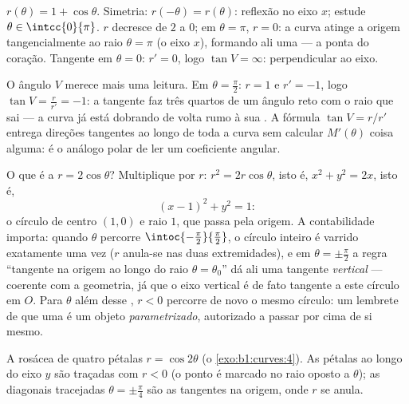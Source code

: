 \begin{example}[A cardioide]\label{ex:b1:curves:cardioid}
$r(\theta) = 1 + \cos\theta$. Simetria: $r(-\theta)
= r(\theta)$: reflexão no eixo $x$; estude
$\theta \in
\intcc{0}{\pi}$. $r$ decresce de $2$ a $0$; em $\theta = \pi$, $r = 0$: a curva atinge a
origem tangencialmente ao raio $\theta = \pi$ (o eixo $x$), formando ali uma
 --- a ponta do coração. Tangente em $\theta = 0$: $r' = 0$, logo
$\tan V = \infty$: perpendicular ao eixo.

O ângulo $V$ merece mais uma leitura. Em $\theta =
\frac\pi2$: $r = 1$ e $r' = -1$,
logo $\tan V = \frac{r}{r'} =
-1$: a tangente faz três quartos de um ângulo reto com o raio
que sai --- a curva já está dobrando de volta rumo à sua . A
fórmula $\tan V = r/r'$ entrega direções tangentes ao longo de toda a curva sem
calcular $M'(\theta)$ coisa alguma: é o análogo polar de ler um coeficiente
angular.
\end{example}

\begin{example}
\label{ex:b1:curves:polarcircle}
O que é a  $r = 2\cos\theta$? Multiplique por $r$: $r^2 = 2r\cos\theta$, isto é,
$x^2 + y^2 = 2x$, isto é,
\[
(x - 1)^2 + y^2 = 1 :
\]
o círculo de centro $(1, 0)$ e raio $1$, que passa pela origem. A
contabilidade importa: quando $\theta$ percorre $\intoc{-\frac\pi2}{\frac\pi2}$, o círculo
inteiro é varrido exatamente uma vez ($r$ anula-se nas duas
extremidades), e em $\theta =
\pm\frac\pi2$ a regra ``tangente na origem ao longo do
raio $\theta = \theta_0$'' dá ali uma tangente \emph{vertical} --- coerente com a
geometria, já que o eixo vertical é de fato tangente a este círculo
em $O$. Para $\theta$ além desse , $r < 0$ percorre de novo
o mesmo círculo: um lembrete de que uma  é um objeto
\emph{parametrizado}, autorizado a passar por cima de si mesmo.
\end{example}

\begin{omfigure}

{\small A rosácea de quatro pétalas $r = \cos 2\theta$ (o \cref{exo:b1:curves:4}). As pétalas ao
longo do eixo $y$ são traçadas com $r < 0$ (o ponto é marcado no raio
oposto a $\theta$); as diagonais tracejadas $\theta = \pm\frac\pi4$ são as tangentes na
origem, onde $r$ se anula.}
\end{omfigure}

